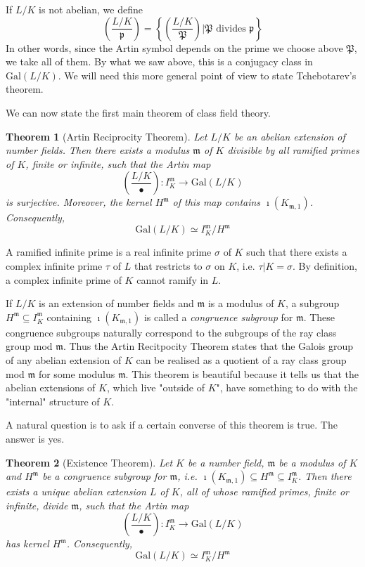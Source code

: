 \documentclass[]{amsart}
\newtheorem{theorem}{Theorem}
\newcommand{\rarr}{\longrightarrow}
\newcommand{\m}{\mathfrak{m}}
\newcommand{\IKm}{I^\mathfrak{m}_K}
\newcommand{\Kmo}{K_{\mathfrak{m},1}}
\newcommand{\p}{\mathfrak{p}}
\renewcommand{\P}{\mathfrak{P}}
\newcommand{\Frob}[2]{\left(\frac{#1}{#2}\right )}
\newcommand{\Gal}{\text{Gal}}
\begin{document}
		If $L/K$ is not abelian, we define
		\[\Frob{L/K}{\p}=\left \{\Frob{L/K}{\P}\left| \P\text{ divides }\p\right .\right \}\]
		In other words, since the Artin symbol depends on the prime we choose above $\P$, we take all of them. By what we saw above, this is a conjugacy class in $\Gal(L/K)$. We will need this more general point of view to state Tchebotarev's theorem. 
		
		We can now state the first main theorem of class field theory.
		
		\begin{theorem}[Artin Reciprocity Theorem]
			Let $L/K$ be an abelian extension of number fields. Then there exists a modulus $\m$ of $K$ divisible by all ramified primes of $K$, finite or infinite, such that the Artin map
			\[\Frob{L/K}{\bullet}:\IKm\rarr\Gal(L/K)\]
			is surjective. Moreover, the kernel $H^\m$ of this map contains $\imath(\Kmo)$. Consequently,
			\[\Gal(L/K)\simeq \IKm/H^\m\]
		\end{theorem}

		A ramified infinite prime is a real infinite prime $\sigma$ of $K$ such that there exists a complex infinite prime $\tau$ of $L$ that restricts to $\sigma$ on $K$, i.e. $\tau|K=\sigma$. By definition, a complex infinite prime of $K$ cannot ramify in $L$. 	
		
		If $L/K$ is an extension of number fields and $\m$ is a modulus of $K$, a subgroup $H^\m\subseteq\IKm$ containing $\imath(\Kmo)$ is called a \emph{congruence subgroup} for $\m$. These congruence subgroups naturally correspond to the subgroups of the ray class group mod $\m$. Thus the Artin Recitpocity Theorem states that the Galois group of any abelian extension of $K$ can be realised as a quotient of a ray class group mod $\m$ for some modulus $\m$. This theorem is beautiful because it tells us that the abelian extensions of $K$, which live "outside of $K$", have something to do with the "internal" structure of $K$. 
		
		A natural question is to ask if a certain converse of this theorem is true. The answer is yes.
		
		\begin{theorem}[Existence Theorem]
			Let $K$ be a number field, $\m$ be a modulus of $K$	and $H^\m$ be a congruence subgroup for $\m$, i.e. $\imath(\Kmo)\subseteq H^\m\subseteq\IKm$. Then there exists a unique abelian extension $L$ of $K$, all of whose ramified primes, finite or infinite, divide $\m$, such that the Artin map
			\[\Frob{L/K}{\bullet}:\IKm\rarr\Gal(L/K)\]
			has kernel $H^\m$. Consequently,
			\[\Gal(L/K)\simeq \IKm/H^\m\]
		\end{theorem}
\end{document}
